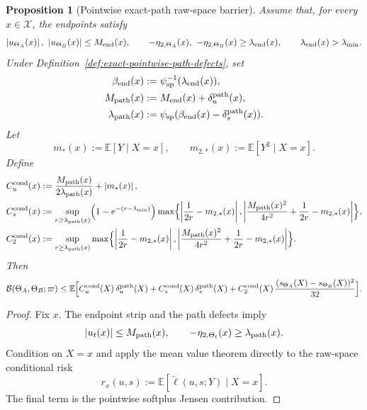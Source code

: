 \documentclass[11pt]{article}
\newtheorem{proposition}{Proposition}
\newcommand{\E}{\mathbb{E}}
\newcommand{\abs}[1]{\left\lvert #1 \right\rvert}
\newcommand{\cB}{\mathcal{B}}
\begin{document}
\begin{proposition}[Pointwise exact-path raw-space barrier]
\label{prop:xdependent-exact-path-rawspace}
Assume that, for every $x\in\mathcal X$, the endpoints satisfy
\[
  \abs{u_{\Theta_A}(x)},\ \abs{u_{\Theta_B}(x)}\le M_{\rm end}(x),
  \qquad
  -\eta_{2,\Theta_A}(x),\ -\eta_{2,\Theta_B}(x)\ge \lambda_{\rm end}(x),
  \qquad
  \lambda_{\rm end}(x)>\lambda_{\min}.
\]
Under Definition~\ref{def:exact-pointwise-path-defects}, set
\begin{align*}
  \beta_{\rm end}(x)
  &:=
  \psi_{\rm sp}^{-1}(\lambda_{\rm end}(x)),
  \\
  M_{\rm path}(x)
  &:=
  M_{\rm end}(x)+\delta_u^{\rm path}(x),
  \\
  \lambda_{\rm path}(x)
  &:=
  \psi_{\rm sp}(\beta_{\rm end}(x)-\delta_s^{\rm path}(x)).
\end{align*}
Let
\[
  m_\ast(x):=\E[Y\mid X=x],
  \qquad
  m_{2,\ast}(x):=\E[Y^2\mid X=x].
\]
Define
\begin{align}
  C_u^{\rm cond}(x)
  &:=
  \frac{M_{\rm path}(x)}{2\lambda_{\rm path}(x)}+\abs{m_\ast(x)},
  \label{eq:Cu-cond}
  \\
  C_s^{\rm cond}(x)
  &:=
  \sup_{r\ge \lambda_{\rm path}(x)}
  \Bigl(1-e^{-(r-\lambda_{\min})}\Bigr)
  \max\Bigl\{
    \abs{\frac{1}{2r}-m_{2,\ast}(x)},
    \abs{\frac{M_{\rm path}(x)^2}{4r^2}+\frac{1}{2r}-m_{2,\ast}(x)}
  \Bigr\},
  \label{eq:Cs-cond}
  \\
  C_2^{\rm cond}(x)
  &:=
  \sup_{r\ge \lambda_{\rm path}(x)}
  \max\Bigl\{
    \abs{\frac{1}{2r}-m_{2,\ast}(x)},
    \abs{\frac{M_{\rm path}(x)^2}{4r^2}+\frac{1}{2r}-m_{2,\ast}(x)}
  \Bigr\}.
  \label{eq:C2-cond}
\end{align}
Then
\begin{equation}
  \cB(\Theta_A,\Theta_B;\varpi)
  \le
  \E\Bigl[
    C_u^{\rm cond}(X)\,\delta_u^{\rm path}(X)
    +
    C_s^{\rm cond}(X)\,\delta_s^{\rm path}(X)
    +
    C_2^{\rm cond}(X)\,\frac{(s_{\Theta_A}(X)-s_{\Theta_B}(X))^2}{32}
  \Bigr].
  \label{eq:xdependent-exact-path-rawspace}
\end{equation}
\end{proposition}

\begin{proof}
Fix $x$. The endpoint strip and the path defects imply
\[
  \abs{u_t(x)}\le M_{\rm path}(x),
  \qquad
  -\eta_{2,\Theta_t}(x)\ge \lambda_{\rm path}(x).
\]
Condition on $X=x$ and apply the mean value theorem directly to the
raw-space conditional risk
\[
  r_x(u,s):=\E[\tilde\ell(u,s;Y)\mid X=x].
\]
The final term is the pointwise softplus Jensen contribution.
\end{proof}
\end{document}
